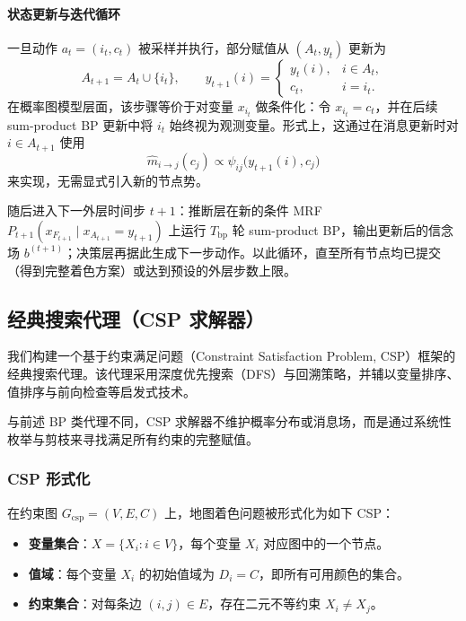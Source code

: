 \paragraph{状态更新与迭代循环}
一旦动作 $a_t=(i_t,c_t)$ 被采样并执行，部分赋值从 $(A_t,y_t)$ 更新为
\begin{equation}
  A_{t+1}=A_t\cup\{i_t\},\qquad
  y_{t+1}(i)=
  \begin{cases}
    y_t(i), & i\in A_t,\\
    c_t,    & i=i_t.
  \end{cases}
\end{equation}
在概率图模型层面，该步骤等价于对变量 $x_{i_t}$ 做条件化：令 $x_{i_t}=c_t$，并在后续 sum-product BP 更新中将 $i_t$ 始终视为观测变量。形式上，这通过在消息更新时对 $i\in A_{t+1}$ 使用
\begin{equation}
  \hat{m}_{i\to j}(c_j)\propto \psi_{ij}\bigl(y_{t+1}(i),c_j\bigr)
\end{equation}
来实现，无需显式引入新的节点势。

随后进入下一外层时间步 $t+1$：推断层在新的条件 MRF $P_{t+1}(x_{F_{t+1}}\mid x_{A_{t+1}}=y_{t+1})$ 上运行 $T_{\mathrm{bp}}$ 轮 sum-product BP，输出更新后的信念场 $b^{(t+1)}$；决策层再据此生成下一步动作。以此循环，直至所有节点均已提交（得到完整着色方案）或达到预设的外层步数上限。
\subsection{经典搜索代理（CSP 求解器）}
\label{sec:csp-agent}

我们构建一个基于约束满足问题（Constraint Satisfaction Problem, CSP）框架的经典搜索代理。该代理采用深度优先搜索（DFS）与回溯策略，并辅以变量排序、值排序与前向检查等启发式技术。

与前述 BP 类代理不同，CSP 求解器不维护概率分布或消息场，而是通过系统性枚举与剪枝来寻找满足所有约束的完整赋值。

\subsubsection{CSP 形式化}
在约束图 $G_{\mathrm{csp}}=(V,E,C)$ 上，地图着色问题被形式化为如下 CSP：
\begin{itemize}
  \item \textbf{变量集合}：$X=\{X_i: i\in V\}$，每个变量 $X_i$ 对应图中的一个节点。
  \item \textbf{值域}：每个变量 $X_i$ 的初始值域为 $D_i=C$，即所有可用颜色的集合。
  \item \textbf{约束集合}：对每条边 $(i,j)\in E$，存在二元不等约束 $X_i\neq X_j$。
\end{itemize}

